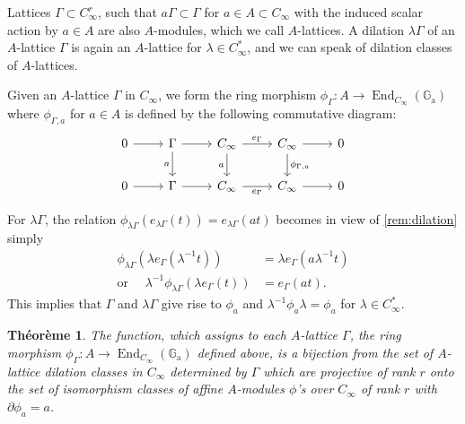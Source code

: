 \documentclass[12pt,a4paper]{article}
\theoremstyle{plain}
\newtheorem{theorem}{Th\'eor\`eme}[section]
\theoremstyle{definition}
\theoremstyle{remark}
\DeclareMathOperator{\End}{End}
\newcommand{\Ga}{\mathbb{G}_\mathrm{a}}
\providecommand{\Ga}{\mathbb{G}_{\mathrm a}}
\providecommand{\End}{\operatorname{End}}
\begin{document}
Lattices $\Gamma \subset C_\infty^r$, such that $a\Gamma \subset \Gamma$ for $a \in A \subset C_\infty$ with the induced scalar action by $a \in A$ are also $A$-modules, which we call $A$-lattices. A dilation $\lambda\Gamma$ of an $A$-lattice $\Gamma$ is again an $A$-lattice for $\lambda \in C_\infty^*$, and we can speak of dilation classes of $A$-lattices.

Given an $A$-lattice $\Gamma$ in $C_\infty$, we form the ring morphism $\phi_\Gamma: A \to \End_{C_\infty}(\Ga)$ where $\phi_{\Gamma, a}$ for $a \in A$ is defined by the following commutative diagram:
\[
\begin{tikzcd}
0 \arrow[r] & \Gamma \arrow[r] \arrow[d, "a"'] & C_\infty \arrow[r, "e_\Gamma"] \arrow[d, "a"'] & C_\infty \arrow[r] \arrow[d, "\phi_{\Gamma, a}"] & 0 \\
0 \arrow[r] & \Gamma \arrow[r] & C_\infty \arrow[r, "e_\Gamma"'] & C_\infty \arrow[r] & 0
\end{tikzcd}
\]

For $\lambda\Gamma$, the relation $\phi_{\lambda\Gamma}(e_{\lambda\Gamma}(t)) = e_{\lambda\Gamma}(at)$ becomes in view of \eqref{rem:dilation} simply
\begin{align*}
\phi_{\lambda\Gamma}(\lambda e_\Gamma(\lambda^{-1} t)) &= \lambda e_\Gamma(a \lambda^{-1} t) \\
\text{or } \quad \lambda^{-1} \phi_{\lambda\Gamma}(\lambda e_\Gamma(t)) &= e_\Gamma(at).
\end{align*}
This implies that $\Gamma$ and $\lambda\Gamma$ give rise to $\phi_a$ and $\lambda^{-1} \phi_a \lambda = \phi_a$ for $\lambda \in C_\infty^*$.

\begin{theorem}
\label{thm:bijection}
The function, which assigns to each $A$-lattice $\Gamma$, the ring morphism $\phi_\Gamma: A \to \End_{C_\infty}(\Ga)$ defined above, is a bijection from the set of $A$-lattice dilation classes in $C_\infty$ determined by $\Gamma$ which are projective of rank $r$ onto the set of isomorphism classes of affine $A$-modules $\phi$'s over $C_\infty$ of rank $r$ with $\partial \phi_a = a$.
\end{theorem}
\end{document}
